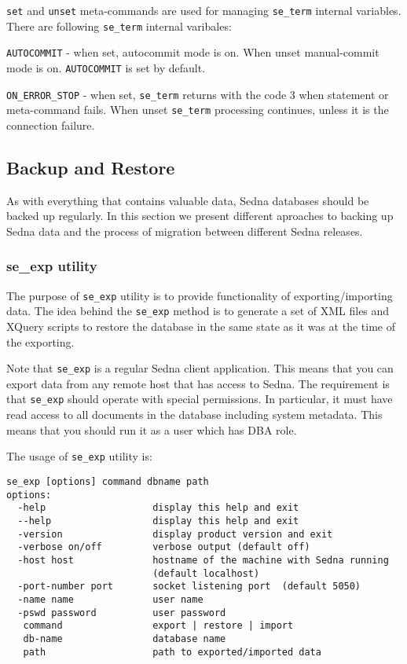 \documentclass[a4paper,12pt]{article}
\begin{document}
\verb!set! and \verb!unset! meta-commands are used for managing \verb!se_term! internal variables. There are following \verb!se_term! internal varibales:

\verb!AUTOCOMMIT! - when set, autocommit mode is on. When unset manual-commit mode is on. \verb!AUTOCOMMIT! is set by default.

\verb!ON_ERROR_STOP! - when set, \verb!se_term! returns with the code 3 when statement or meta-command fails. When unset \verb!se_term! processing continues, unless it is the connection failure.


\subsection{Backup and Restore}

As with everything that contains valuable data, Sedna databases should be backed up regularly.
In this section we present different aproaches to backing up Sedna data and the process of 
migration between different Sedna releases.


\subsubsection{se\_exp utility}

The purpose of \verb!se_exp! utility is to provide functionality of exporting/importing data. The 
idea behind the \verb!se_exp! method is to generate a set of XML files and XQuery 
scripts to restore the database in the same state as it was at the time of the exporting. 

Note that \verb!se_exp! is a regular Sedna client application. This means that you can export data from
any remote host that has access to Sedna. The requirement is that \verb!se_exp! should operate with 
special permissions. In particular, it must have read access to all documents in the database including 
system metadata. This means that you should run it as a user which has DBA role.

The usage of \verb!se_exp! utility is:

\begin{verbatim}
se_exp [options] command dbname path
options:
  -help                   display this help and exit
  --help                  display this help and exit
  -version                display product version and exit
  -verbose on/off         verbose output (default off)
  -host host              hostname of the machine with Sedna running
                          (default localhost)
  -port-number port       socket listening port  (default 5050)
  -name name              user name
  -pswd password          user password
   command                export | restore | import
   db-name                database name
   path                   path to exported/imported data
\end{verbatim}
\end{document}
